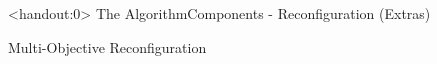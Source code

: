 \documentclass[xcolor=svgnames,aspectratio=32,8pt]{beamer}
\begin{document}

\begin{frame}<handout:0>
  {The Algorithm}{Components - Reconfiguration (Extras)}
  \begin{changemargin}{-0.9cm}{-1cm}

  \begin{minipage}[H]{0.35\paperwidth}
  \centering
  \vspace{0.1cm}
  Multi-Objective Reconfiguration\\
  \vspace{1.1cm}
  {\tiny
    \def\firstcircle{(90:0.6cm) circle (1.5cm)}
    \def\secondcircle{(210:1.9cm) circle (1.5cm)}
    \def\thirdcircle{(330:1.9cm) circle (1.5cm)}
    \def\fourthcircle{(90:-2.6cm) circle (1.5cm)}

}
\end{minipage}
\end{changemargin}
\end{frame}
\end{document}
